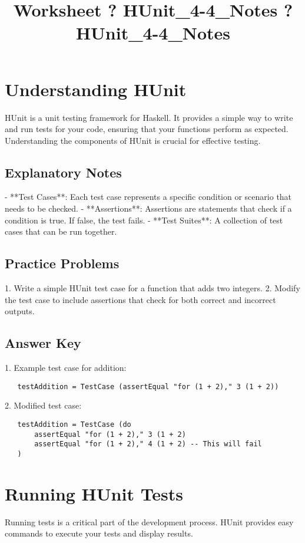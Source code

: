 \documentclass{article}
\title{Worksheet ? HUnit\_4-4\_Notes ? HUnit\_4-4\_Notes}
\author{}
\date{}
\begin{document}
\maketitle

\section*{Understanding HUnit}
HUnit is a unit testing framework for Haskell. It provides a simple way to write and run tests for your code, ensuring that your functions perform as expected. Understanding the components of HUnit is crucial for effective testing.

\subsection*{Explanatory Notes}
- **Test Cases**: Each test case represents a specific condition or scenario that needs to be checked.
- **Assertions**: Assertions are statements that check if a condition is true. If false, the test fails.
- **Test Suites**: A collection of test cases that can be run together.

\subsection*{Practice Problems}
1. Write a simple HUnit test case for a function that adds two integers.
2. Modify the test case to include assertions that check for both correct and incorrect outputs.

\subsection*{Answer Key}
1. Example test case for addition:
   \begin{verbatim}
   testAddition = TestCase (assertEqual "for (1 + 2)," 3 (1 + 2))
   \end{verbatim}
2. Modified test case:
   \begin{verbatim}
   testAddition = TestCase (do
       assertEqual "for (1 + 2)," 3 (1 + 2)
       assertEqual "for (1 + 2)," 4 (1 + 2) -- This will fail
   )
   \end{verbatim}

\section*{Running HUnit Tests}
Running tests is a critical part of the development process. HUnit provides easy commands to execute your tests and display results.
\end{document}
